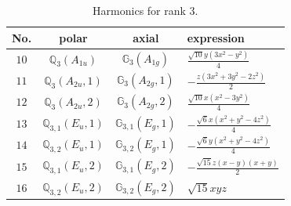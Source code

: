 \documentclass[fleqn,8pt,landscape]{jsarticle}
\begin{document}
\begin{table}[ht!]
\begin{center}
\caption{Harmonics for rank 3.}
\renewcommand{\arraystretch}{1.3}
\begin{tabular}{cccl} \hline \hline
No. & polar & axial & expression \\ \hline
$ 10 $ & $ \mathbb{Q}_{3}(A_{1u}) $ & $ \mathbb{G}_{3}(A_{1g}) $ & $ \frac{\sqrt{10} y \left(3 x^{2} - y^{2}\right)}{4} $ \\
$ 11 $ & $ \mathbb{Q}_{3}(A_{2u},1) $ & $ \mathbb{G}_{3}(A_{2g},1) $ & $ - \frac{z \left(3 x^{2} + 3 y^{2} - 2 z^{2}\right)}{2} $ \\
$ 12 $ & $ \mathbb{Q}_{3}(A_{2u},2) $ & $ \mathbb{G}_{3}(A_{2g},2) $ & $ \frac{\sqrt{10} x \left(x^{2} - 3 y^{2}\right)}{4} $ \\
$ 13 $ & $ \mathbb{Q}_{3,1}(E_{u},1) $ & $ \mathbb{G}_{3,1}(E_{g},1) $ & $ - \frac{\sqrt{6} x \left(x^{2} + y^{2} - 4 z^{2}\right)}{4} $ \\
$ 14 $ & $ \mathbb{Q}_{3,2}(E_{u},1) $ & $ \mathbb{G}_{3,2}(E_{g},1) $ & $ - \frac{\sqrt{6} y \left(x^{2} + y^{2} - 4 z^{2}\right)}{4} $ \\
$ 15 $ & $ \mathbb{Q}_{3,1}(E_{u},2) $ & $ \mathbb{G}_{3,1}(E_{g},2) $ & $ - \frac{\sqrt{15} z \left(x - y\right) \left(x + y\right)}{2} $ \\
$ 16 $ & $ \mathbb{Q}_{3,2}(E_{u},2) $ & $ \mathbb{G}_{3,2}(E_{g},2) $ & $ \sqrt{15} x y z $ \\
 \hline \hline
\end{tabular}
\end{center}
\end{table}
\end{document}
